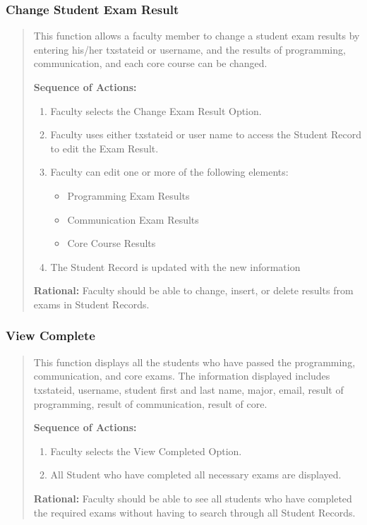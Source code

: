    \subsubsection{Change Student Exam Result}
   \begin{quote} %
         This function allows a faculty member to change a student exam
         results by entering his/her txstateid or username, and the results of
         programming, communication, and each core course can be changed.
         
         \textbf{Sequence of Actions:}
         \begin{enumerate}
            \item Faculty selects the Change Exam Result Option.
            \item Faculty uses either txstateid or user name to access the Student
               Record to edit the Exam Result.
            \item Faculty can edit one or more of the following elements:
            \begin{itemize}
               \item Programming Exam Results
               \item Communication Exam Results
               \item Core Course Results
            \end{itemize}
            \item The Student Record is updated with the new information
      \end{enumerate}

         \textbf{Rational:}
         Faculty should be able to change, insert, or delete results from exams
         in Student Records.
   \end{quote} %

   \subsubsection{View Complete}
   \begin{quote} %
         This function displays all the students who have passed the
         programming, communication, and core exams. The information
         displayed includes txstateid, username, student first and last
         name, major, email, result of programming, result of communication,
         result of core.
         
         \textbf{Sequence of Actions:}
         \begin{enumerate}
            \item Faculty selects the View Completed Option.
            \item All Student who have completed all necessary exams are displayed.
      \end{enumerate}

         \textbf{Rational:}
         Faculty should be able to see all students who have completed the
         required exams without having to search through all Student Records.
   \end{quote} %


